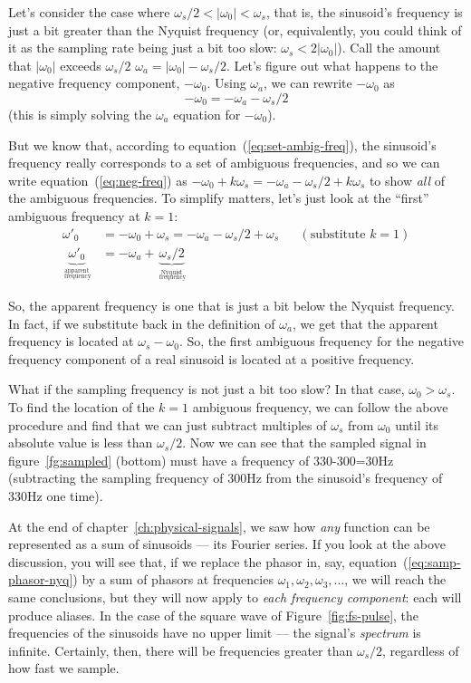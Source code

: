 Let's consider the case where $\omega_s/2 < |\omega_0| < \omega_s$,
that is, the sinusoid's frequency is just a bit greater than the
Nyquist frequency (or, equivalently, you could think of it as the
sampling rate being just a bit too slow: $\omega_s <
2|\omega_0|$). Call the amount that $|\omega_0|$ exceeds $\omega_s/2$
$\omega_a = |\omega_0| - \omega_s/2$.  Let's figure out what
happens to the negative frequency component, $-\omega_0$. Using
$\omega_a$, we can rewrite $-\omega_0$ as
\begin{equation}
-\omega_0 = -\omega_a - \omega_s/2
\label{eq:neg-freq}
\end{equation}
(this is simply solving the $\omega_a$ equation for $-\omega_0$).

But we know that, according to equation~(\ref{eq:set-ambig-freq}), the
sinusoid's frequency really corresponds to a set of ambiguous
frequencies, and so we can write equation~(\ref{eq:neg-freq}) as
$-\omega_0 + k\omega_s = -\omega_a - \omega_s/2 + k\omega_s$ to show
\emph{all} of the ambiguous frequencies. To simplify matters, let's
just look at the ``first'' ambiguous frequency at $k=1$:
\begin{align*}
\omega'_0 &= -\omega_0 + \omega_s = -\omega_a- \omega_s/2 + \omega_s
            && (\text{substitute $k=1$}) \\ 
\underbrace{\omega'_0}_{\stackrel{\text{apparent}}{_\text{ frequency}}} &= - \omega_a +
     \underbrace{\omega_s/2}_{\stackrel{\text{Nyquist}}{_\text{ frequency}}}
\end{align*}

So, the apparent frequency is one that is just a bit below the Nyquist
frequency. In fact, if we substitute back in the definition of
$\omega_a$, we get that the apparent frequency is located at $\omega_s
- \omega_0$. So, the first ambiguous frequency for the negative
frequency component of a real sinusoid is located at a positive
frequency.

What if the sampling frequency is not just a bit too slow? In that
case, $\omega_0 > \omega_s$. To find the location of the $k=1$
ambiguous frequency, we can follow the above procedure and find that
we can just subtract multiples of $\omega_s$ from $\omega_0$ until its
absolute value is less than $\omega_s/2$.  Now we can see that the
sampled signal in figure~\ref{fg:sampled} (bottom) must have a frequency of
330-300=30Hz (subtracting the sampling frequency of 300Hz from the
sinusoid's frequency of 330Hz one time).

At the end of chapter~\ref{ch:physical-signals}, we saw how
\emph{any} function can be represented as a sum of sinusoids --- its
Fourier series. If you look at the above discussion, you will see
that, if we replace the phasor in, say,
equation~(\ref{eq:samp-phasor-nyq}) by a sum of phasors at frequencies
$\omega_1, \omega_2, \omega_3, \ldots$, we will reach the same
conclusions, but they will now apply to \emph{each frequency
  component}: each will produce aliases. In the case of the square
wave of Figure~\ref{fig:fs-pulse}, the frequencies of the sinusoids
have no upper limit --- the signal's \emph{spectrum} is infinite.
Certainly, then, there will be frequencies greater than $\omega_s/2$,
regardless of how fast we sample.

